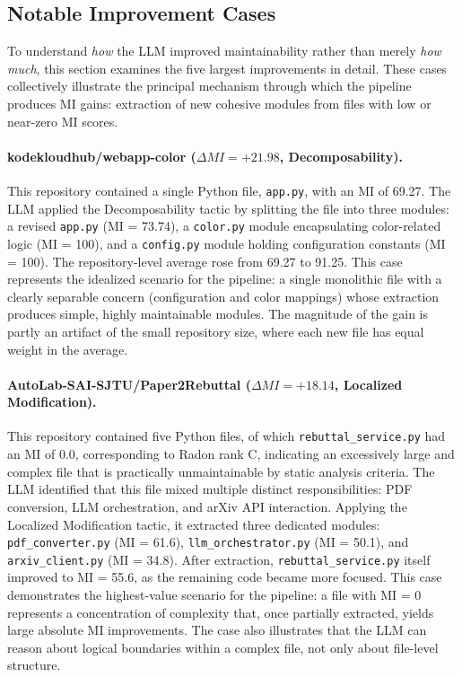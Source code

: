 \documentclass[sigconf,review,anonymous]{acmart}
\begin{document}
\subsection{Notable Improvement Cases}
\label{subsec:exp5_cases}

To understand \textit{how} the LLM improved maintainability rather than merely \textit{how much}, this section examines the five largest improvements in detail. These cases collectively illustrate the principal mechanism through which the pipeline produces MI gains: extraction of new cohesive modules from files with low or near-zero MI scores.

\paragraph{kodekloudhub/webapp-color ($\Delta MI = +21.98$, Decomposability).}
This repository contained a single Python file, \texttt{app.py}, with an MI of 69.27. The LLM applied the Decomposability tactic by splitting the file into three modules: a revised \texttt{app.py} (MI = 73.74), a \texttt{color.py} module encapsulating color-related logic (MI = 100), and a \texttt{config.py} module holding configuration constants (MI = 100). The repository-level average rose from 69.27 to 91.25. This case represents the idealized scenario for the pipeline: a single monolithic file with a clearly separable concern (configuration and color mappings) whose extraction produces simple, highly maintainable modules. The magnitude of the gain is partly an artifact of the small repository size, where each new file has equal weight in the average.

\paragraph{AutoLab-SAI-SJTU/Paper2Rebuttal ($\Delta MI = +18.14$, Localized Modification).}
This repository contained five Python files, of which \texttt{rebuttal\_service.py} had an MI of 0.0, corresponding to Radon rank C, indicating an excessively large and complex file that is practically unmaintainable by static analysis criteria. The LLM identified that this file mixed multiple distinct responsibilities: PDF conversion, LLM orchestration, and arXiv API interaction. Applying the Localized Modification tactic, it extracted three dedicated modules: \texttt{pdf\_converter.py} (MI = 61.6), \texttt{llm\_orchestrator.py} (MI = 50.1), and \texttt{arxiv\_client.py} (MI = 34.8). After extraction, \texttt{rebuttal\_service.py} itself improved to MI = 55.6, as the remaining code became more focused. This case demonstrates the highest-value scenario for the pipeline: a file with MI = 0 represents a concentration of complexity that, once partially extracted, yields large absolute MI improvements. The case also illustrates that the LLM can reason about logical boundaries within a complex file, not only about file-level structure.
\end{document}
